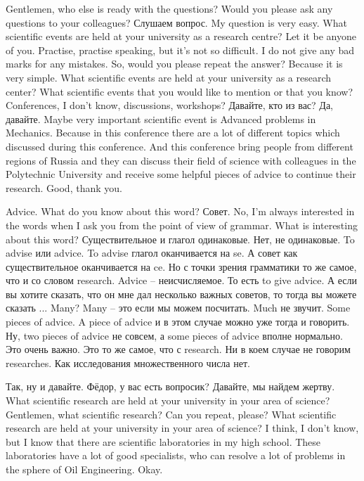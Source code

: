 \documentclass[main.tex]{subfiles}
\begin{document}
Gentlemen, who else is ready with the questions?
Would you please ask any questions to your colleagues?
Слушаем вопрос.
My question is very easy.
What scientific events are held at your university as a research centre?
Let it be anyone of you.
Practise, practise speaking, but it's not so difficult.
I do not give any bad marks for any mistakes.
So, would you please repeat the answer?
Because it is very simple.
What scientific events are held at your university as a research center?
What scientific events that you would like to mention or that you know?
Conferences, I don't know, discussions, workshops?
Давайте, кто из вас?
Да, давайте.
Maybe very important scientific event is Advanced problems in Mechanics.
Because in this conference there are a lot of different topics which discussed during this conference.
And this conference bring people from different regions of Russia and they can discuss their field of science with colleagues in the Polytechnic University and receive some helpful pieces of advice to continue their research.
Good, thank you.

Advice.
What do you know about this word?
Совет.
No, I'm always interested in the words when I ask you from the point of view of grammar.
What is interesting about this word?
Существительное и глагол одинаковые.
Нет, не одинаковые.
To advise или advice.
To advise глагол оканчивается на se.
А совет как существительное оканчивается на ce.
Но с точки зрения грамматики то же самое, что и со словом research.
Advice -- неисчисляемое.
То есть to give advice.
А если вы хотите сказать, что он мне дал несколько важных советов, то тогда вы можете сказать ...
Many?
Many -- это если мы можем посчитать.
Much не звучит.
Some pieces of advice.
A piece of advice и в этом случае можно уже тогда и говорить.
Ну, two pieces of advice не совсем, а some pieces of advice вполне нормально.
Это очень важно.
Это то же самое, что с research.
Ни в коем случае не говорим researches.
Как исследования множественного числа нет.

Так, ну и давайте.
Фёдор, у вас есть вопросик?
Давайте, мы найдем жертву.
What scientific research are held at your university in your area of science?
Gentlemen, what scientific research?
Can you repeat, please?
What scientific research are held at your university in your area of science?
I think, I don't know, but I know that there are scientific laboratories in my high school.
These laboratories have a lot of good specialists, who can resolve a lot of problems in the sphere of Oil Engineering.
Okay.
\end{document}
